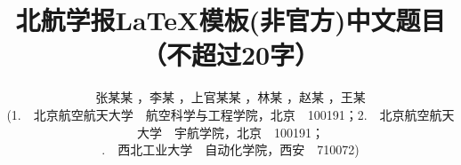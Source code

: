 \documentclass[10.5pt,twocolumn]{jbuaa}
\begin{document}
 \title{
 \vspace{1cm} \erhao\hei 北航学报\LaTeX 模板(非官方)中文题目 \sihao\fang （不超过20字）\vspace{-0.2cm}
 }
 
 \author{
 \sihao\fang 张某某 ，李某 ，上官某某 ，林某 ，赵某 ，王某 \\[0.1cm]
 \liuhao (1.~~北京航空航天大学~~航空科学与工程学院，北京~~100191；2.~~北京航空航天大学~~宇航学院，北京~~100191；\\ 
 .~~西北工业大学~~自动化学院，西安~~710072) 
 }
 
 \date{}  %
 
\end{document}
